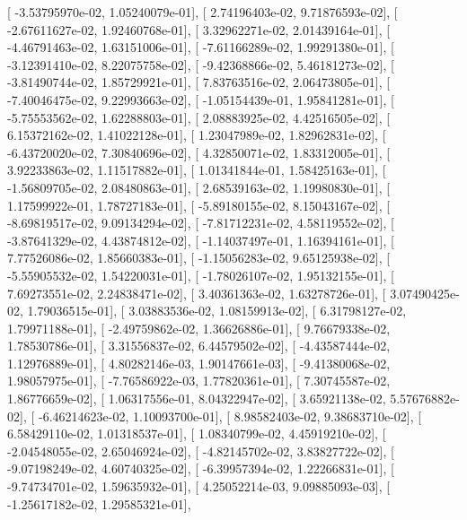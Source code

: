 \documentclass{article}
\begin{document}
       [ -3.53795970e-02,   1.05240079e-01],
       [  2.74196403e-02,   9.71876593e-02],
       [ -2.67611627e-02,   1.92460768e-01],
       [  3.32962271e-02,   2.01439164e-01],
       [ -4.46791463e-02,   1.63151006e-01],
       [ -7.61166289e-02,   1.99291380e-01],
       [ -3.12391410e-02,   8.22075758e-02],
       [ -9.42368866e-02,   5.46181273e-02],
       [ -3.81490744e-02,   1.85729921e-01],
       [  7.83763516e-02,   2.06473805e-01],
       [ -7.40046475e-02,   9.22993663e-02],
       [ -1.05154439e-01,   1.95841281e-01],
       [ -5.75553562e-02,   1.62288803e-01],
       [  2.08883925e-02,   4.42516505e-02],
       [  6.15372162e-02,   1.41022128e-01],
       [  1.23047989e-02,   1.82962831e-02],
       [ -6.43720020e-02,   7.30840696e-02],
       [  4.32850071e-02,   1.83312005e-01],
       [  3.92233863e-02,   1.11517882e-01],
       [  1.01341844e-01,   1.58425163e-01],
       [ -1.56809705e-02,   2.08480863e-01],
       [  2.68539163e-02,   1.19980830e-01],
       [  1.17599922e-01,   1.78727183e-01],
       [ -5.89180155e-02,   8.15043167e-02],
       [ -8.69819517e-02,   9.09134294e-02],
       [ -7.81712231e-02,   4.58119552e-02],
       [ -3.87641329e-02,   4.43874812e-02],
       [ -1.14037497e-01,   1.16394161e-01],
       [  7.77526086e-02,   1.85660383e-01],
       [ -1.15056283e-02,   9.65125938e-02],
       [ -5.55905532e-02,   1.54220031e-01],
       [ -1.78026107e-02,   1.95132155e-01],
       [  7.69273551e-02,   2.24838471e-02],
       [  3.40361363e-02,   1.63278726e-01],
       [  3.07490425e-02,   1.79036515e-01],
       [  3.03883536e-02,   1.08159913e-02],
       [  6.31798127e-02,   1.79971188e-01],
       [ -2.49759862e-02,   1.36626886e-01],
       [  9.76679338e-02,   1.78530786e-01],
       [  3.31556837e-02,   6.44579502e-02],
       [ -4.43587444e-02,   1.12976889e-01],
       [  4.80282146e-03,   1.90147661e-03],
       [ -9.41380068e-02,   1.98057975e-01],
       [ -7.76586922e-03,   1.77820361e-01],
       [  7.30745587e-02,   1.86776659e-02],
       [  1.06317556e-01,   8.04322947e-02],
       [  3.65921138e-02,   5.57676882e-02],
       [ -6.46214623e-02,   1.10093700e-01],
       [  8.98582403e-02,   9.38683710e-02],
       [  6.58429110e-02,   1.01318537e-01],
       [  1.08340799e-02,   4.45919210e-02],
       [ -2.04548055e-02,   2.65046924e-02],
       [ -4.82145702e-02,   3.83827722e-02],
       [ -9.07198249e-02,   4.60740325e-02],
       [ -6.39957394e-02,   1.22266831e-01],
       [ -9.74734701e-02,   1.59635932e-01],
       [  4.25052214e-03,   9.09885093e-03],
       [ -1.25617182e-02,   1.29585321e-01],
\end{document}
